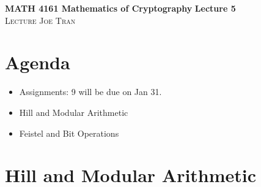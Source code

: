\documentclass[11pt]{article}
\theoremstyle{definition}\newtheorem{definition}{Definition}
\theoremstyle{definition}\newtheorem{example}{Example}
\theoremstyle{definition}\newtheorem{samplecode}{Sample Code}
\begin{document}
\noindent \textbf{MATH 4161 Mathematics of Cryptography} \hfill \textbf{Lecture 5} \\
\noindent \textsc{Lecture} \hfill \textsc{Joe Tran}

\section{Agenda}

\begin{itemize}
    \item Assignments: 9 will be due on Jan 31.
    \item Hill and Modular Arithmetic
    \item Feistel and Bit Operations
\end{itemize}

\section{Hill and Modular Arithmetic}
\end{document}
